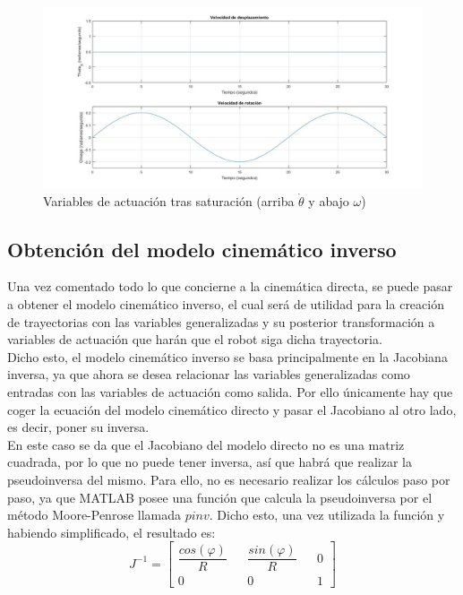 \documentclass[a4paper,twoside]{article}
\begin{document}
\begin{itemize}
	\begin{figure}[h!]
		\centering
		\includegraphics[width=1\textwidth]{exp_MCD_3_2}
		\caption{Variables de actuación tras saturación (arriba $\dot{\theta}$ y abajo $\omega$)}
		\label{exp_MCD_3_2}
	\end{figure}
	\end{itemize}

\newpage
	\subsection{Obtención del modelo cinemático inverso}
Una vez comentado todo lo que concierne a la cinemática directa, se puede pasar a obtener el modelo cinemático inverso, el cual será de utilidad para la creación de trayectorias con las variables generalizadas y su posterior transformación a variables de actuación que harán que el robot siga dicha trayectoria.\\

Dicho esto, el modelo cinemático inverso se basa principalmente en la Jacobiana inversa, ya que ahora se desea relacionar las variables generalizadas como entradas con las variables de actuación como salida. Por ello únicamente hay que coger la ecuación del modelo cinemático directo y pasar el Jacobiano al otro lado, es decir, poner su inversa. \\

En este caso se da que el Jacobiano del modelo directo no es una matriz cuadrada, por lo que no puede tener inversa, así que habrá que realizar la pseudoinversa del mismo. Para ello, no es necesario realizar los cálculos paso por paso, ya que MATLAB posee una función que calcula la pseudoinversa por el método Moore-Penrose llamada $pinv$. Dicho esto, una vez utilizada la función y habiendo simplificado, el resultado es:
\begin{equation}
	J^{-1}=
	\begin{bmatrix}
	\dfrac{cos(\varphi)}{R} && \dfrac{sin(\varphi)}{R} && 0\\
	0 && 0 && 1
	\end{bmatrix}
\end{equation}
\end{document}
